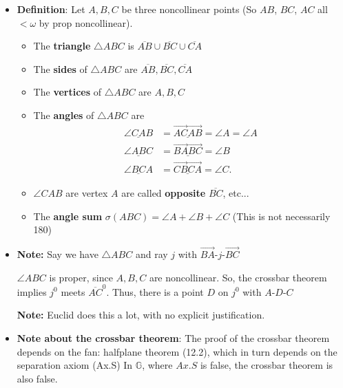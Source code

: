 \documentclass{report}
\begin{document}
\begin{itemize}
        \item \textbf{Definition}: Let $A,B,C$ be three noncollinear points (So $AB$, $BC$, $AC$ all $< \omega$ by prop noncollinear). 
            \bigbreak \noindent 
            \begin{itemize}
                \item The \textbf{triangle} $\triangle ABC$ is $\overline{AB} \cup \overline{BC} \cup \overline{CA}$
                \item The \textbf{sides} of $\triangle ABC$ are $\overline{AB}, \overline{BC}, \overline{CA}$
                \item The \textbf{vertices} of $\triangle ABC$ are $A,B,C$
                \item The \textbf{angles} of $\triangle ABC$ are
                    \begin{align*}
                        \underline{\angle CAB} &= \underline{\overrightarrow{AC}\overrightarrow{AB}} = \angle A = \angle A \\
                        \underline{\angle ABC} &= \underline{\overrightarrow{BA}\overrightarrow{BC}} = \angle B \\
                        \underline{\angle BCA} &= \underline{\overrightarrow{CB}\overrightarrow{CA}} = \angle C
                    .\end{align*}
                \item $\angle CAB$ are vertex $A$ are called \textbf{opposite} $\overline{BC}$, etc...
                \item The \textbf{angle sum} $\sigma(ABC) = \angle A + \angle B + \angle C$ (This is not necessarily 180)
            \end{itemize}
        \item \textbf{Note:} Say we have $\triangle ABC$ and ray $j$ with $ \overrightarrow{BA}\text{-}j\text{-}\overrightarrow{BC} $
            \begin{figure}[ht]
                \centering
                \label{fig:mytri}
            \end{figure}
            $\angle ABC$ is proper, since $A,B,C$ are noncollinear. So, the crossbar theorem implies  $j^{0}$ meets $\overline{AC}^{0}$. Thus, there is a point $D$ on $j^{0}$ with $ A\text{-}D\text{-}C$
            \bigbreak \noindent 
            \begin{figure}[ht]
                \centering
                \label{fig:mytri2}
            \end{figure}
            \bigbreak \noindent 
            \textbf{Note:} Euclid does this a lot, with no explicit justification.
        \item \textbf{Note about the crossbar theorem}: The proof of the crossbar theorem depends on the fan: halfplane theorem (12.2), which in turn depends on the separation axiom (Ax.S)
            \bigbreak \noindent 
            In $\mathbb{G}$, where $Ax.S$ is false, the crossbar theorem is also false.




    \end{itemize}
\end{document}

